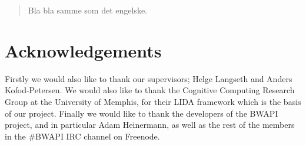 \documentclass[a4paper, twoside, openright, 12pt]{report}
\begin{document}
\begin{abstract}
Bla bla samme som det engelske.
\end{abstract}
\thispagestyle{empty}
\cleardoublepage

\chapter*{Acknowledgements}
\thispagestyle{empty}

Firstly we would also like to thank our supervisors; Helge Langseth and Anders Kofod-Petersen. We would also like to thank the Cognitive Computing Research Group at the University of Memphis, for their LIDA framework which is the basis of our project. Finally we would like to thank the developers of the BWAPI project, and in particular Adam Heinermann, as well as the rest of the members in the \#BWAPI IRC channel on Freenode.

\clearpage

\cleardoublepage


\tableofcontents
\cleardoublepage
\listoffigures
\cleardoublepage
\thispagestyle{empty}
\cleardoublepage

\pagestyle{fancy}






\endrefsection

\cleardoublepage
{}
{}
\printbibliography[segment=0]
\end{document}
